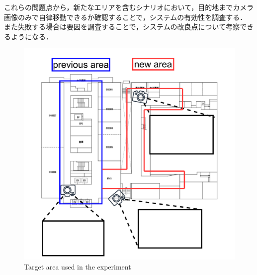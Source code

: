 これらの問題点から，新たなエリアを含むシナリオにおいて，目的地までカメラ画像のみで自律移動できるか確認することで，システムの有効性を調査する．
また失敗する場合は要因を調査することで，システムの改良点について考察できるようになる．

\begin{figure}[htbp]
     \centering
     \includegraphics[width=130mm]{images/pdf/ishiguro/cit3f.pdf}
     \caption{Target area used in the experiment}
     \label{fig:cit3f}
\end{figure}

\newpage

